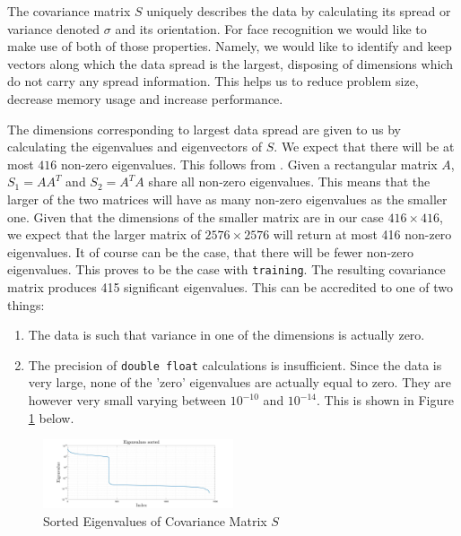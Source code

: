 \documentclass[10pt,twocolumn,letterpaper]{article}
\begin{document}
The covariance matrix $S$ uniquely describes the data by calculating its spread or variance denoted $\sigma$ and its orientation. For face recognition we would like to make use of both of those properties. Namely, we would like to identify and keep vectors along which the data spread is the largest, disposing of dimensions which do not carry any spread information. This helps us to reduce problem size, decrease memory usage and increase performance. 

The dimensions corresponding to largest data spread are given to us by calculating the eigenvalues and eigenvectors of $S$. We expect that there will be at most $416$ non-zero eigenvalues. This follows from \cite{Data Mining}. Given a rectangular matrix $A$, $S_1 = AA^T$ and $S_2 = A^TA$ share all non-zero eigenvalues. This means that the larger of the two matrices will have as many non-zero eigenvalues as the smaller one. Given that the dimensions of the smaller matrix are in our case $416 \times 416$, we expect that the larger matrix of $2576 \times 2576$ will return at most 416 non-zero eigenvalues. It of course can be the case, that there will be fewer non-zero eigenvalues. This proves to be the case with {\tt\small training}. The resulting covariance matrix produces 415 significant eigenvalues. This can be accredited to one of two things:

\begin{enumerate}
\item The data is such that variance in one of the dimensions is actually zero.
\item The precision of {\tt\small double float} calculations is insufficient. Since the data is very large, none of the 'zero' eigenvalues are actually equal to zero. They are however very small varying between $10^{-10}$ and $10^{-14}$. This is shown in Figure \ref{fig:Eig1} below.
\end{enumerate}

\begin{figure}[H]

\centering
\includegraphics[width=0.5\textwidth]{../results/Q1A_PCA_Eigenvalues}

  \caption{Sorted Eigenvalues of Covariance Matrix $S$ \label{fig:Eig1}}

\end{figure}
\end{document}
